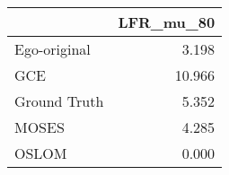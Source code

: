 \begin{tabular}{lr}
\toprule
{} & LFR_mu_80 \\
\midrule
Ego-original &     3.198 \\
GCE          &    10.966 \\
Ground Truth &     5.352 \\
MOSES        &     4.285 \\
OSLOM        &     0.000 \\
\bottomrule
\end{tabular}
